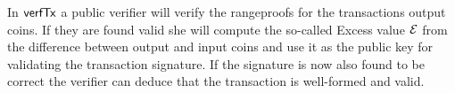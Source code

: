 In $\mathsf{verfTx}$ a public verifier will verify the rangeproofs for the transactions output coins. If they are found valid she will compute the so-called Excess value $\mathcal{E}$ from the difference between output and input coins
and use it as the public key for validating the transaction signature. If the signature is now also found to be correct the verifier can deduce that the transaction is well-formed and valid.

\begin{figure}
    \begin{center}
\end{center}
\end{figure}
